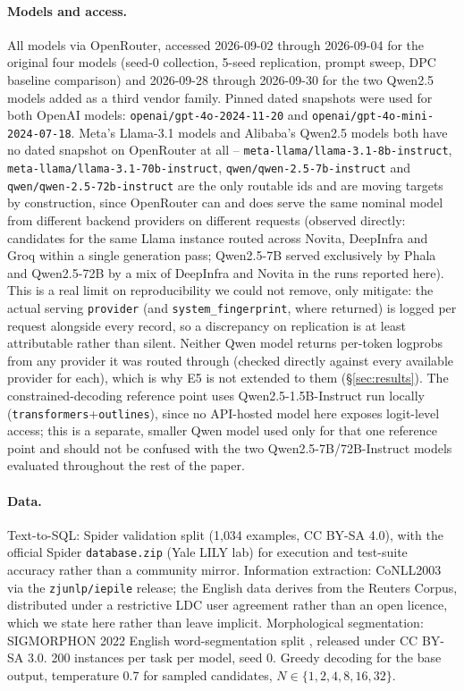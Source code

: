\documentclass[11pt]{article}
\begin{document}
\paragraph{Models and access.} All models via OpenRouter, accessed
2026-09-02 through 2026-09-04 for the original four models (seed-0
collection, 5-seed replication, prompt sweep, DPC baseline comparison)
and 2026-09-28 through 2026-09-30 for the two Qwen2.5 models added as a
third vendor family. Pinned
dated snapshots were used for both OpenAI
models: \texttt{openai/gpt-4o-2024-11-20} and
\texttt{openai/gpt-4o-mini-2024-07-18}. Meta's Llama-3.1 models and
Alibaba's Qwen2.5 models both have no
dated snapshot on OpenRouter at all -- \texttt{meta-llama/llama-3.1-8b-instruct},
\texttt{meta-llama/llama-3.1-70b-instruct}, \texttt{qwen/qwen-2.5-7b-instruct}
and \texttt{qwen/qwen-2.5-72b-instruct} are the only routable ids
and are moving targets by construction, since OpenRouter can and does
serve the same nominal model from different backend providers on
different requests (observed directly: candidates for the same Llama
instance
routed across Novita, DeepInfra and Groq within a single generation
pass; Qwen2.5-7B served exclusively by Phala and Qwen2.5-72B by a
mix of DeepInfra and Novita in the runs reported here). This is a real limit on
reproducibility we could not remove, only mitigate: the actual serving
\texttt{provider} (and \texttt{system\_fingerprint}, where returned) is
logged per request alongside every record, so a discrepancy on
replication is at least attributable rather than silent. Neither Qwen
model returns per-token logprobs from any provider it was routed
through (checked directly against every available provider for
each), which is why E5 is not extended to them (\S\ref{sec:results}). The
constrained-decoding reference point uses Qwen2.5-1.5B-Instruct run locally
(\texttt{transformers}+\texttt{outlines}), since no API-hosted model here
exposes logit-level access; this is a separate, smaller Qwen model used
only for that one reference point and should not be confused with the
two Qwen2.5-7B/72B-Instruct models evaluated throughout the rest of the
paper.

\paragraph{Data.} Text-to-SQL: Spider validation split (1{,}034 examples, CC
BY-SA 4.0), with the official Spider \texttt{database.zip} (Yale LILY lab) for
execution and test-suite accuracy rather than a community mirror. Information
extraction: CoNLL2003 \citep{tjongkimsang2003conll} via the \texttt{zjunlp/iepile} release; the
English data derives from the Reuters Corpus, distributed under a restrictive
LDC user agreement rather than an open licence, which we state here rather
than leave implicit. Morphological
segmentation: SIGMORPHON 2022 English word-segmentation split
\citep{batsuren2022sigmorphon}, released under CC BY-SA 3.0. 200 instances per
task per model, seed 0. Greedy decoding for the base output, temperature 0.7 for
sampled candidates, $N\in\{1,2,4,8,16,32\}$.
\end{document}
